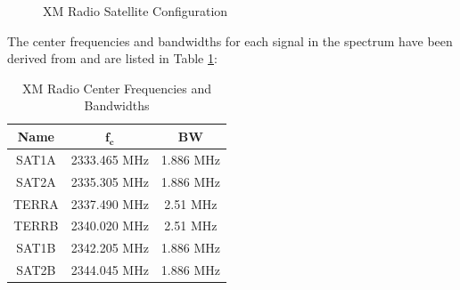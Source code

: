 \documentclass[conference,onecolumn]{IEEEtran}
\begin{document}

\begin{figure}[H]
	\centerline{}
	\caption{XM Radio Satellite Configuration \cite{5586866}}
	\label{fig::xm_satellite_config}
\end{figure}

	\noindent The center frequencies and bandwidths for each signal in the spectrum have been derived from \cite{andreas_2010_us8594559b2} and are listed in Table \ref{table::center_freq_and_bw}:
\vspace{-12pt}
\begin{table}[H]
	\begin{center}
	\caption{XM Radio Center Frequencies and Bandwidths}
	\label{table::center_freq_and_bw}
	\begin{tabular}{| c | c | c |}
		\hline
		\textbf{Name} & $\mathbf{f_c}$ & \textbf{BW}\\
		\hline
		SAT1A & 2333.465 MHz & 1.886 MHz\\
		\hline
		SAT2A & 2335.305 MHz & 1.886 MHz\\
		\hline
		TERRA & 2337.490 MHz & 2.51 MHz \\
		\hline
		TERRB & 2340.020 MHz & 2.51 MHz \\
		\hline
		SAT1B & 2342.205 MHz & 1.886 MHz\\
		\hline
		SAT2B & 2344.045 MHz & 1.886 MHz\\
		\hline
	\end{tabular}
	\end{center}
\end{table}
\end{document}
